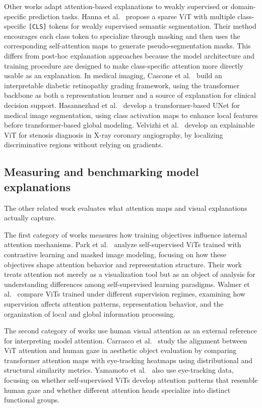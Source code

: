 \documentclass[lineno,pdflatex,sn-mathphys-num]{sn-jnl}%
\theoremstyle{thmstyleone}%
\theoremstyle{thmstyletwo}%
\theoremstyle{thmstylethree}%
\begin{document}
Other works adapt attention-based explanations to weakly supervised or domain-specific prediction tasks. Hanna et al.~\cite{Hanna25ICCV} propose a sparse ViT with multiple class-specific \texttt{[CLS]} tokens for weakly supervised semantic segmentation. Their method encourages each class token to specialize through masking and then uses the corresponding self-attention maps to generate pseudo-segmentation masks. This differs from post-hoc explanation approaches because the model architecture and training procedure are designed to make class-specific attention more directly usable as an explanation. In medical imaging, Cascone et al.~\cite{Cascone25ICCV} build an interpretable diabetic retinopathy grading framework, using the transformer backbone as both a representation learner and a source of explanation for clinical decision support. Hasannezhad et al.~\cite{Hasannezhad2025} develop a transformer-based UNet for medical image segmentation, using class activation maps to enhance local features before transformer-based global modeling. Velvizhi et al.~\cite{Velvizhi2026} develop an explainable ViT for stenosis diagnosis in X-ray coronary angiography, by localizing discriminative regions without relying on gradients. 

\subsection{Measuring and benchmarking model explanations}

The other related work evaluates what attention maps and visual explanations actually capture. 

The first category of works measures how training objectives influence internal attention mechanisms. Park et al.~\cite{park2023what} analyze self-supervised ViTs trained with contrastive learning and masked image modeling, focusing on how these objectives shape attention behavior and representation structure. Their work treats attention not merely as a visualization tool but as an object of analysis for understanding differences among self-supervised learning paradigms. Walmer et al.~\cite{Walmer23CVPR} compare ViTs trained under different supervision regimes, examining how supervision affects attention patterns, representation behavior, and the organization of local and global information processing. 

The second category of works use human visual attention as an external reference for interpreting model attention. Carrasco et al.~\cite{Carrasco2026} study the alignment between ViT attention and human gaze in aesthetic object evaluation by comparing transformer attention maps with eye-tracking heatmaps using distributional and structural similarity metrics. Yamamoto et al.~\cite{Yamamoto2025} also use eye-tracking data, focusing on whether self-supervised ViTs develop attention patterns that resemble human gaze and whether different attention heads specialize into distinct functional groups. 
\end{document}
